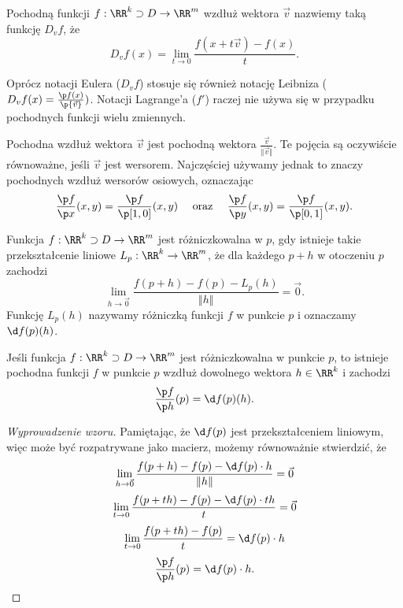 \begin{definition}
    Pochodną funkcji $f : \RR^k \supset D \to \RR^m$ wzdłuż wektora $\vec{v}$ nazwiemy taką funkcję $D_v f$, że
    \[ D_v f(x) = \lim_{t\to 0}\frac{f(x + t\vec{v}) - f(x)}{t}. \]
\end{definition}

Oprócz notacji Eulera ($D_v f$) stosuje się również notację Leibniza ($D_v f(x) = \frac{\p f(x)}{\p{\vec{v}}})$. Notacji Lagrange'a ($f'$) raczej nie używa się w przypadku pochodnych funkcji wielu zmiennych.

Pochodna wzdłuż wektora $\vec{v}$ jest pochodną  wektora $\frac{\vec{v}}{\Vert\vec{v}\Vert}$. Te pojęcia są oczywiście równoważne, jeśli $\vec{v}$ jest wersorem. Najczęściej używamy jednak  to znaczy pochodnych wzdłuż wersorów osiowych, oznaczając
\[ \frac{\p f}{\p x}(x, y) = \frac{\p f}{\p [1, 0]}(x, y) \hspace{1em}\text{ oraz }\hspace{1em} \frac{\p f}{\p y}(x, y) = \frac{\p f}{\p [0, 1]}(x, y). \]

\begin{definition}[różniczka]
    Funkcja $f : \RR^k \supset D \to \RR^m$ jest różniczkowalna w $p$, gdy istnieje takie przekształcenie liniowe $L_{p} : \RR^k \to \RR^m$, że dla każdego $p + h$ w otoczeniu $p$ zachodzi
    \[ \lim_{h\to\vec{0}} \frac{f(p + h) - f(p) - L_{p}(h)}{\Vert h \Vert} = \vec{0}. \]
    Funkcję $L_{p}(h)$ nazywamy różniczką funkcji $f$ w punkcie $p$ i oznaczamy $\d f(p)(h)$.
\end{definition}

\begin{theorem}
    \label{t:differentiability implies derivability}
    Jeśli funkcja $f : \RR^k \supset D \to \RR^m$ jest różniczkowalna w punkcie $p$, to istnieje pochodna funkcji $f$ w punkcie $p$ wzdłuż dowolnego wektora $h \in \RR^k$ i zachodzi
    \[ \frac{\p f}{\p h}(p) = \d f(p)(h). \]
\end{theorem}
\begin{proof}[Wyprowadzenie wzoru]
    Pamiętając, że $\d f(p)$ jest przekształceniem liniowym, więc może być rozpatrywane jako macierz, możemy równoważnie stwierdzić, że
    \[ \lim_{h\to\vec{0}} \frac{f(p + h) - f(p) - \d f(p) \cdot h}{\Vert h \Vert} = \vec{0} \]
    \[ \lim_{t\to 0} \frac{f(p + th) - f(p) - \d f(p) \cdot th}{t} = \vec{0} \]
    \[ \lim_{t\to 0} \frac{f(p + th) - f(p)}{t} = \d f(p)\cdot h \]
    \[ \frac{\p f}{\p h}(p) = \d f(p)\cdot h. \]
\end{proof}

